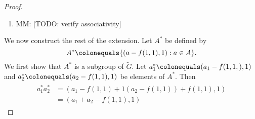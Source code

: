 \documentclass{dcthesis}
\newcommand{\mm}[1]{{\color{blue} \sf MM: [#1]}}
\newcommand{\wt}[1]{\widetilde{#1}}
\theoremstyle{definition}
\theoremstyle{remark}
\numberwithin{equation}{section}
\numberwithin{figure}{section}
\begin{document}
{{\begin{proof}
\begin{enumerate}
          Let $(a,g)\in A\times G$.
          We claim that
          \begin{equation}
            \label{eqn:aginverses}
            (a,g)^{-1}
            =
            (-g^{-1}a-f(g^{-1},g)-f(1,1), g^{-1}).
          \end{equation}
          We have \mm{TODO: verify inverse}
          \begin{align}
            \label{eqn:justgoforit}
            \begin{split}
              (a,g)(-g^{-1}a-f(g^{-1},g)-f(1,1), g^{-1})
              &=(,gg^{-1})\\
              &=(-f(1,1),1)\\
              (-g^{-1}a-f(g^{-1},g)-f(1,1), g^{-1})(a,g)
              &=(,g^{-1}g)\\
              &=(-f(1,1),1)
            \end{split}
          \end{align}
        \item
          \mm{TODO: verify associativity}
          \label{itm:associativity}
      \end{enumerate}
      We now construct the rest of the extension.
      Let $A^*$ be defined by
      \begin{equation}
        \label{eqn:Astar}
        A^*\colonequals
        \{(a-f(1,1), 1):a\in A\}.
      \end{equation}
      We first show that $A^*$ is a subgroup of $\wt{G}$.
      Let
      $a_1^*\colonequals(a_1-f(1,1,),1)$
      and
      $a_2^*\colonequals(a_2-f(1,1),1)$
      be elements of $A^*$.
      Then
      \begin{align}
        \label{eqn:subgroupAstar}
        \begin{split}
          a_1^*a_2^*
          &=(a_1-f(1,1)+1(a_2-f(1,1))+f(1,1), 1)\\
          &=(a_1+a_2-f(1,1),1)
        \end{split}

\end{align}
\end{proof}}}
\end{document}
